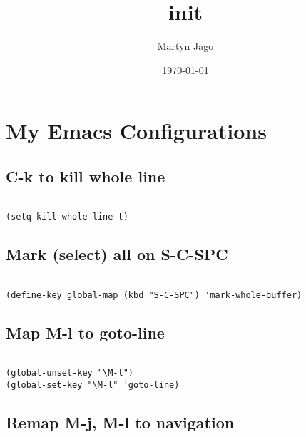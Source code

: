 \documentclass[colorlinks=true,urlcolor=blue,listings-sv]{article}
\title{init}
\author{Martyn Jago}
\date{\today}
\begin{document}
\maketitle

\setcounter{tocdepth}{3}
\tableofcontents
\vspace*{1cm}

\section{My Emacs Configurations}
\label{sec-1}
\subsection{C-k to kill whole line}
\label{sec-1-1}
\label{df2f072d-30d1-40e9-9905-deb39a963b1d}



\lstset{language=Lisp}
\begin{lstlisting}

(setq kill-whole-line t)
\end{lstlisting}
\subsection{Mark (select) all on S-C-SPC}
\label{sec-1-2}
\label{bac7b873-a758-4991-afe7-abba7aada174}



\lstset{language=Lisp}
\begin{lstlisting}

(define-key global-map (kbd "S-C-SPC") 'mark-whole-buffer)
\end{lstlisting}
\subsection{Map M-l to goto-line}
\label{sec-1-3}
\label{d90de769-45ce-4e5a-a878-88d0e76e162a}



\lstset{language=Lisp}
\begin{lstlisting}

(global-unset-key "\M-l")
(global-set-key "\M-l" 'goto-line)
\end{lstlisting}
\subsection{Remap M-j, M-l to navigation}
\label{sec-1-4}
\label{ffa0b60c-9281-44ff-b939-c6c00dc7b728}
\end{document}
